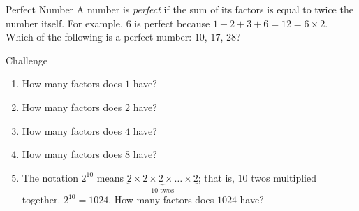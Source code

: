 \documentclass[12pt,letterpaper]{article}
\begin{document}
\begin{problem}{Perfect Number}
 A number is \emph{perfect} if the sum of its factors is
 equal to twice the number itself. For example, $6$ is
 perfect because $1+2+3+6=12=6\times2$. Which of the
 following is a perfect number: $10$, $17$, $28$?
\end{problem}

\begin{problem}{Challenge}
 \begin{enumerate}
  \item How many factors does $1$ have?
  \item How many factors does $2$ have?
  \item How many factors does $4$ have?
  \item How many factors does $8$ have?
  \item The notation $2^{10}$ means $\underbrace{
  2\times2\times2\times
  \ldots\times2}_\text{$10$ twos}$; that is, $10$ twos multiplied together.
  $2^{10}=1024$. How many factors does $1024$ have?
 \end{enumerate}

\end{problem}
\end{document}
